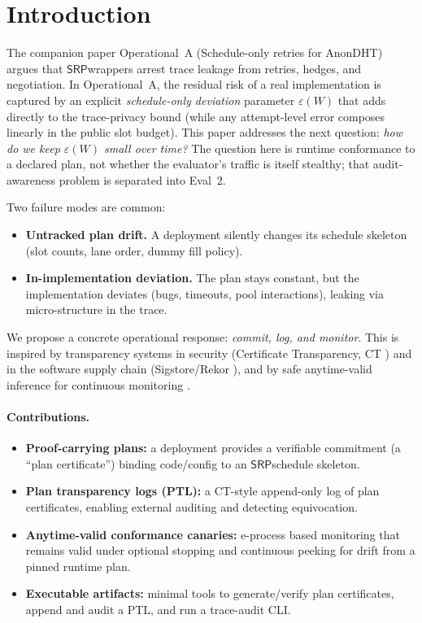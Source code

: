\documentclass[11pt]{article}
\newcommand{\SRP}{\ensuremath{\mathsf{SRP}}}
\begin{document}
\section{Introduction}

The companion paper Operational~A (Schedule-only retries for AnonDHT) argues that \SRP wrappers arrest trace leakage from retries, hedges, and negotiation.\cite{series:operationalA}
In Operational~A, the residual risk of a real implementation is captured by an explicit \emph{schedule-only deviation} parameter $\varepsilon(W)$ that adds directly to the trace-privacy bound (while any attempt-level error composes linearly in the public slot budget).
This paper addresses the next question: \emph{how do we keep $\varepsilon(W)$ small over time?} The question here is runtime conformance to a declared plan, not whether the evaluator's traffic is itself stealthy; that audit-awareness problem is separated into Eval~2.

Two failure modes are common:
\begin{itemize}[leftmargin=*]
  \item \textbf{Untracked plan drift.} A deployment silently changes its schedule skeleton (slot counts, lane order, dummy fill policy).
  \item \textbf{In-implementation deviation.} The plan stays constant, but the implementation deviates (bugs, timeouts, pool interactions),
        leaking via micro-structure in the trace.
\end{itemize}

We propose a concrete operational response: \emph{commit, log, and monitor}.
This is inspired by transparency systems in security (Certificate Transparency, CT \cite{rfc6962,rfc9162})
and in the software supply chain (Sigstore/Rekor \cite{newmanSigstore2022,rekorDocs}),
and by safe anytime-valid inference for continuous monitoring \cite{ramdasSAVIStatSci2023,shaferTestingByBetting,ramdasEvaluesEbook2025,lySAVITutorial2025}.

\paragraph{Contributions.}
\begin{itemize}[leftmargin=*]
  \item \textbf{Proof-carrying plans:} a deployment provides a verifiable commitment (a ``plan certificate'') binding code/config to an \SRP schedule skeleton.
  \item \textbf{Plan transparency logs (PTL):} a CT-style append-only log of plan certificates, enabling external auditing and detecting equivocation.
  \item \textbf{Anytime-valid conformance canaries:} e-process based monitoring that remains valid under optional stopping and continuous peeking for drift from a pinned runtime plan.
  \item \textbf{Executable artifacts:} minimal tools to generate/verify plan certificates, append and audit a PTL, and run a trace-audit CLI.
\end{itemize}
\end{document}
